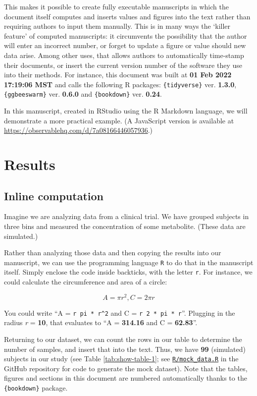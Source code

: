 \documentclass[smallextended]{svjour3}       %
\begin{document}
This makes it possible to create fully executable manuscripts in which the document itself computes and inserts values and figures into the text rather than requiring authors to input them manually. This is in many ways the `killer feature' of computed manuscripts: it circumvents the possibility that the author will enter an incorrect number, or forget to update a figure or value should new data arise. Among other uses, that allows authors to automatically time-stamp their documents, or insert the current version number of the software they use into their methods. For instance, this document was built at \textbf{01 Feb 2022 17:19:06 MST} and calls the following R packages: \texttt{\{tidyverse\}} ver. \textbf{1.3.0}, \texttt{\{ggbeeswarm\}} ver. \textbf{0.6.0} and \texttt{\{bookdown\}} ver. \textbf{0.24}.

In this manuscript, created in RStudio using the R Markdown language, we will demonstrate a more practical example. (A JavaScript version is available at \url{https://observablehq.com/d/7a08166446057936}.)

\hypertarget{results}{%
\section{Results}\label{results}}

\hypertarget{sec:1}{%
\subsection{Inline computation}\label{sec:1}}

Imagine we are analyzing data from a clinical trial. We have grouped subjects in three bins and measured the concentration of some metabolite. (These data are simulated.)

Rather than analyzing those data and then copying the results into our manuscript, we can use the programming language \texttt{R} to do that in the manuscript itself. Simply enclose the code inside backticks, with the letter \texttt{r}. For instance, we could calculate the circumference and area of a circle:

\[A = \pi r^2, C = 2 \pi r\]

You could write ``A = \texttt{\textasciigrave{}r\ pi\ *\ r\^{}2\textasciigrave{}} and C = \texttt{\textasciigrave{}r\ 2\ *\ pi\ *\ r\textasciigrave{}}''. Plugging in the radius \emph{r} = \textbf{10}, that evaluates to ``A = \textbf{314.16} and C = \textbf{62.83}''.

Returning to our dataset, we can count the rows in our table to determine the number of samples, and insert that into the text. Thus, we have \textbf{99} (simulated) subjects in our study (see Table \ref{tab:show-table-1}; see \href{https://github.com/jperkel/computed_manuscript/blob/main/R/mock_data.R}{\texttt{R/mock\_data.R}} in the GitHub repository for code to generate the mock dataset). Note that the tables, figures and sections in this document are numbered automatically thanks to the \texttt{\{bookdown\}} package.
\end{document}

